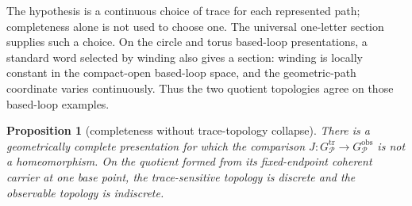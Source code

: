 \documentclass[10pt,reqno]{amsart}
\theoremstyle{definition}
\theoremstyle{plain}
\newtheorem{proposition}[definition]{Proposition}
\theoremstyle{remark}
\begin{document}
The hypothesis is a continuous choice of trace for each represented path;
completeness alone is not used to choose one.  The universal one-letter
section supplies such a choice.  On the circle and torus based-loop
presentations, a standard word selected by winding also gives a section:
winding is locally constant in the compact-open based-loop space, and the
geometric-path coordinate varies continuously.  Thus the two quotient
topologies agree on those based-loop examples.

\begin{proposition}[completeness without trace-topology collapse]
\label{prop:complete-trace-separation}
There is a geometrically complete presentation for which the comparison
$J:G_{\mathcal P}^{\mathrm{tr}}\to G_{\mathcal P}^{\mathrm{obs}}$ is not a
homeomorphism.  On the quotient formed from its fixed-endpoint coherent
carrier at one base point, the trace-sensitive topology is discrete and the
observable topology is indiscrete.
\end{proposition}
\end{document}
